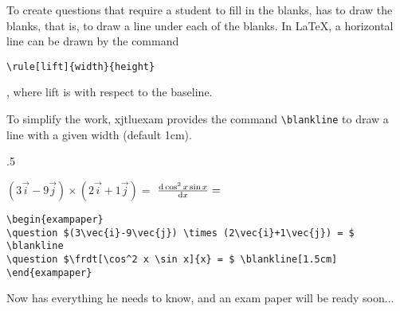 To create questions that require a student to fill in the blanks, \raul{} has to draw the blanks, that is, to draw a line under each of the blanks. In \LaTeX{}, a horizontal line can be drawn by the command
\begin{verbatim}
\rule[lift]{width}{height}
\end{verbatim}
, where lift is with respect to the baseline.

To simplify the work, xjtluexam provides the command \verb=\blankline= to draw a line with a given width (default 1cm).
\begin{miniexammar}{.5\textandmarginlen}{
\begin{exampaper}
\question $(3\vec{i}-9\vec{j}) \times (2\vec{i}+1\vec{j}) = $ \blankline
\question $\frdt[\cos^2 x \sin x]{x} = $ \blankline[1.5cm]
\end{exampaper}
}
\begin{lstlisting}
\begin{exampaper}
\question $(3\vec{i}-9\vec{j}) \times (2\vec{i}+1\vec{j}) = $ \blankline
\question $\frdt[\cos^2 x \sin x]{x} = $ \blankline[1.5cm]
\end{exampaper}
\end{lstlisting}
\end{miniexammar}

Now \raul{} has everything he needs to know, and an exam paper will be ready soon...
